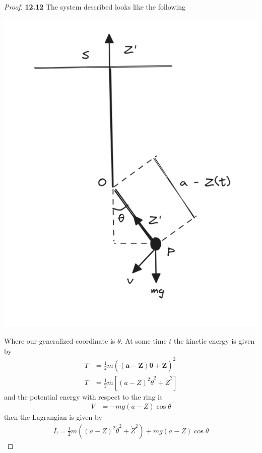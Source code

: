 \documentclass[11pt]{article}
\theoremstyle{definition}
\begin{document}
\cleardoublepage
\begin{proof}{\textbf{12.12}}
    The system described looks like the following
    \begin{center}
        \includegraphics[scale=0.45]{ch12-12.png}
    \end{center}
    Where our generalized coordinate is $\theta$.
    At some time $t$ the kinetic energy is given by
    \begin{align*}
        T &= \frac{1}{2}m( \bm{(a - Z)\dot{\theta}} + \bm{\dot{Z}})^2\\
        T &= \frac{1}{2}m[(a - Z)^2\dot{\theta}^2 + \dot{Z}^2]
    \end{align*}
    and the potential energy with respect to the ring is
    \begin{align*}
        V &= -mg(a - Z)\cos\theta
    \end{align*}
    then the Lagrangian is given by
    \begin{align*}
        L = \frac{1}{2}m((a - Z)^2\dot{\theta}^2
        + \dot{Z}^2)
        + mg(a - Z)\cos\theta
    \end{align*}

\end{proof}
\end{document}

